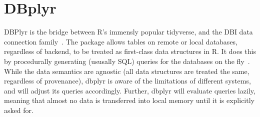 \section{DBplyr}

DBPlyr is the bridge between R’s immensly popular tidyverse, and the DBI data
connection family~\cite{tidy-dplyr}. The package allows tables on remote or
local databases, regardless of backend, to be treated as first-class data
structures in R. It does this by procedurally generating (ususally SQL) queries
for the databases on the fly~\cite{hid-sp18-403-R--dbplyr}. While the data
semantics are agnostic (all data structures are treated the same, regardless of
provenance), dbplyr is aware of the limitations of different systems, and will
adjust its queries accordingly. Further, dbplyr will evaluate queries lazily,
meaning that almost no data is transferred into local memory until it is
explicitly asked for.
